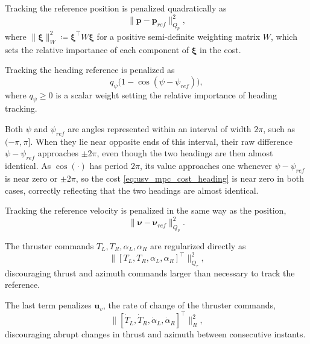 Tracking the reference position is penalized quadratically as
\begin{equation}
    \|\mathbf{p}-\mathbf{p}_{ref}\|^2_{Q_p},
    \label{eq:usv_mpc_cost_pos}
\end{equation}
where $\|\boldsymbol\xi\|^2_W \coloneqq \boldsymbol\xi^\top W \boldsymbol\xi$ for a positive semi-definite weighting matrix $W$, which sets the relative importance of each component of $\boldsymbol\xi$ in the cost.

Tracking the heading reference is penalized as
\begin{equation}
    q_\psi\big(1-\cos(\psi-\psi_{ref})\big),
    \label{eq:usv_mpc_cost_heading}
\end{equation}
where $q_\psi \ge 0$ is a scalar weight setting the relative importance of heading tracking.

Both $\psi$ and $\psi_{ref}$ are angles represented within an interval of width $2\pi$, such as $(-\pi,\pi]$. When they lie near opposite ends of this interval, their raw difference $\psi-\psi_{ref}$ approaches $\pm2\pi$, even though the two headings are then almost identical. As $\cos(\cdot)$ has period $2\pi$, its value approaches one whenever $\psi-\psi_{ref}$ is near zero or $\pm2\pi$, so the cost \eqref{eq:usv_mpc_cost_heading} is near zero in both cases, correctly reflecting that the two headings are almost identical.

Tracking the reference velocity is penalized in the same way as the position,
\begin{equation}
    \|\boldsymbol{\nu}-\boldsymbol{\nu}_{ref}\|^2_{Q_\nu}.
    \label{eq:usv_mpc_cost_vel}
\end{equation}

The thruster commands $T_L, T_R, \alpha_L, \alpha_R$ are regularized directly as
\begin{equation}
    \big\|[T_L,T_R,\alpha_L,\alpha_R]^\top\big\|^2_{Q_\tau},
    \label{eq:usv_mpc_cost_reg}
\end{equation}
discouraging thrust and azimuth commands larger than necessary to track the reference.

The last term penalizes $\mathbf{u}_v$, the rate of change of the thruster commands,
\begin{equation}
    \big\|[\dot{T}_L, \dot{T}_R, \dot{\alpha}_L, \dot{\alpha}_R]^\top\big\|^2_{R},
    \label{eq:usv_mpc_cost_rate}
\end{equation}
discouraging abrupt changes in thrust and azimuth between consecutive instants.

